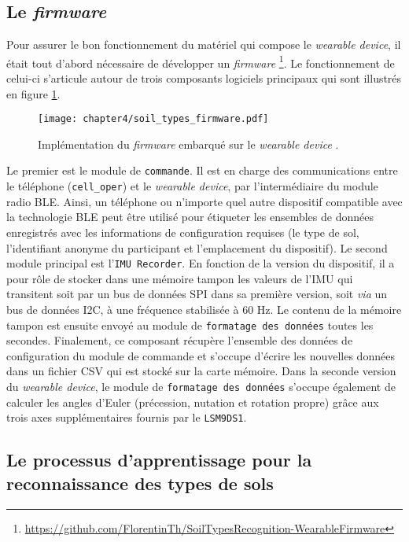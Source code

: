 \subsection{Le \textit{firmware}}

Pour assurer le bon fonctionnement du matériel qui compose le \textit{wearable device}, il était tout d'abord nécessaire de développer un \textit{firmware} \footnote{\url{https://github.com/FlorentinTh/SoilTypesRecognition-WearableFirmware}}. Le fonctionnement de celui-ci s'articule autour de trois composants logiciels principaux qui sont illustrés en figure \ref{fig:soil_types_firmware}.

\begin{figure}[H]
	\centering
	\texttt{[image: chapter4/soil\_types\_firmware.pdf]}
        \caption[Implémentation du \textit{firmware} embarqué sur le \textit{wearable device}.]{Implémentation du \textit{firmware} embarqué sur le \textit{wearable device} \citep{Thullier2017}.}
	\label{fig:soil_types_firmware}
\end{figure}

Le premier est le module de \texttt{commande}. Il est en charge des communications entre le téléphone (\texttt{cell\_oper}) et le \textit{wearable device}, par l'intermédiaire du module radio \acs{BLE}. Ainsi, un téléphone ou n'importe quel autre dispositif compatible avec la technologie \acs{BLE} peut être utilisé pour étiqueter les ensembles de données enregistrés avec les informations de configuration requises (le type de sol, l'identifiant anonyme du participant et l'emplacement du dispositif). Le second module principal est l'\texttt{\acs{IMU} Recorder}. En fonction de la version du dispositif, il a pour rôle de stocker dans une mémoire tampon les valeurs de l'\acs{IMU} qui transitent soit par un bus de données \ac{SPI} dans sa première version, soit \textit{via} un bus de données \ac{I2C}, à une fréquence stabilisée à 60 Hz. Le contenu de la mémoire tampon est ensuite envoyé au module de \texttt{formatage des données} toutes les secondes. Finalement, ce composant récupère l'ensemble des données de configuration du module de commande et s'occupe d'écrire les nouvelles données dans un fichier \ac{CSV} qui est stocké sur la carte mémoire. Dans la seconde version du \textit{wearable device}, le module de \texttt{formatage des données} s'occupe également de calculer les angles d'Euler (précession, nutation et rotation propre) grâce aux trois axes supplémentaires fournis par le \texttt{LSM9DS1}.

\subsection{Le processus d'apprentissage pour la reconnaissance des types de sols}
\label{sec:learn}

